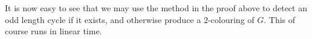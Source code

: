 It is now easy to see that we may use the method in the proof above
to detect an odd length cycle if it exists, and otherwise produce a
$2$-colouring of $G$. This of course runs in linear time.


%
%
%
%
%
%
%
